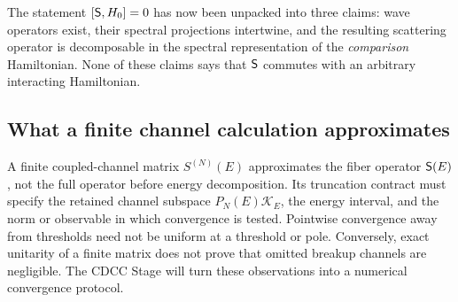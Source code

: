 \begin{checkpointbox}
The statement $[\mathsf{S},H_0]=0$ has now been unpacked into three claims:
wave operators exist, their spectral projections intertwine, and the
resulting scattering operator is decomposable in the spectral representation
of the \textit{comparison} Hamiltonian.  None of these claims says that
$\mathsf{S}$ commutes with an arbitrary interacting Hamiltonian.
\end{checkpointbox}

\subsection{What a finite channel calculation approximates}

A finite coupled-channel matrix $S^{(N)}(E)$ approximates the fiber operator
$\mathsf{S}(E)$, not the full operator before energy decomposition.  Its
truncation contract must specify the retained channel subspace
$P_N(E)\mathcal K_E$, the energy interval, and the norm or observable in which
convergence is tested.  Pointwise convergence away from thresholds need not
be uniform at a threshold or pole.  Conversely, exact unitarity of a finite
matrix does not prove that omitted breakup channels are negligible.  The CDCC
Stage will turn these observations into a numerical convergence protocol.

